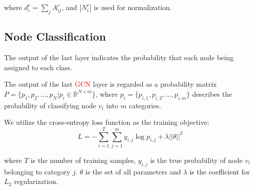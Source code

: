 \noindent where $d_i^r=\sum_{j}A^r_{ij}$, and $|N_i^r|$ is used for normalization.



\subsection{Node Classification}
The output of the last layer indicates the probability that each node being assigned to each class.

The output of the last \textcolor{red}{GCN} layer is regarded as a probability matrix $P=\{p_1,p_2,...,p_N|p_i\in \mathbb{R}^{N \times m}\}$, where $p_i=\{p_{i,1},p_{i,2},...,p_{i,m}\}$ describes the probability of classifying node $v_i$ into $m$ categories.

We utilize the cross-entropy loss function as the training objective:
\begin{equation}
L=-\sum_{i=1}^T\sum_{j=1}^m y_{i,j}\log p_{i,j}+\lambda ||\theta||^2
\end{equation}

\noindent where $T$ is the number of training samples, $y_{i,j}$ is the true probability of node $v_i$ belonging to category $j$. $\theta$ is the set of all parameters and $\lambda$ is the coefficient for $L_2$  regularization.
